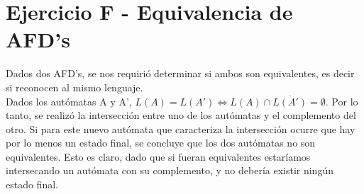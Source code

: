 \section{Ejercicio F - Equivalencia de AFD's}
\indent \indent Dados dos AFD's, se nos requirió determinar si ambos son equivalentes, es decir si reconocen al mismo lenguaje.\\
\indent Dados los autómatas A y A', $L(A) = L(A') \Leftrightarrow L(A) \cap \overline{L(A')} = \emptyset$.
Por lo tanto, se realizó la intersección entre uno de los autómatas y el complemento del otro. Si para este nuevo autómata que caracteriza la intersección ocurre que hay por lo menos un estado final, se concluye que los dos autómatas no son equivalentes. Esto es claro, dado que si fueran equivalentes estaríamos intersecando un autómata con su complemento, y no debería existir ningún estado final.\\
